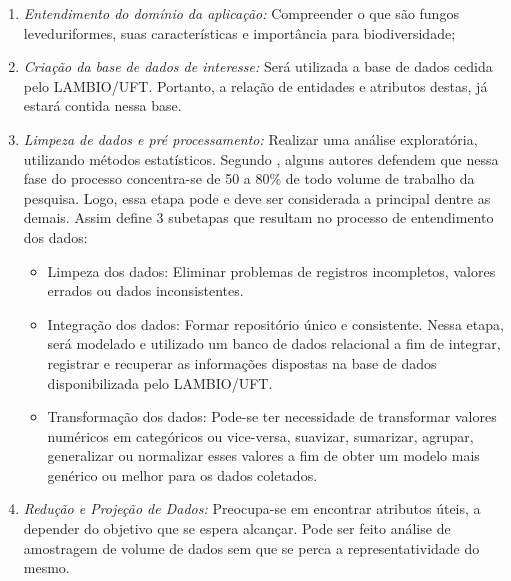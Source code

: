 \documentclass[tcc2]{classe_uftex/uftex}
\begin{document}
\begin{enumerate}
        \item \emph{Entendimento do domínio da aplicação:}
        Compreender o que são fungos leveduriformes, suas características e importância para biodiversidade;
        \item \emph{Criação da base de dados de interesse:}
        Será utilizada a base de dados cedida pelo LAMBIO/UFT. Portanto, a relação de entidades e atributos destas, já estará contida nessa base.
        \item \emph{Limpeza de dados e pré processamento:}
        Realizar uma análise exploratória, utilizando métodos estatísticos. Segundo , alguns autores defendem que nessa fase do processo concentra-se de 50 a 80\% de todo volume de trabalho da pesquisa. Logo, essa etapa pode e deve ser considerada a principal dentre as demais. Assim  define 3 subetapas que resultam no processo de entendimento dos dados:
         \begin{itemize}
             \item Limpeza dos dados:
             Eliminar problemas de registros incompletos, valores errados ou dados inconsistentes.
             \item Integração dos dados:
             Formar repositório único e consistente. Nessa etapa, será modelado e utilizado um banco de dados relacional a fim de integrar, registrar e recuperar as informações dispostas na base de dados disponibilizada pelo LAMBIO/UFT.
             \item Transformação dos dados:
             Pode-se ter necessidade de transformar valores numéricos em categóricos ou vice-versa, suavizar, sumarizar, agrupar, generalizar ou normalizar esses valores a fim de obter um modelo mais genérico ou melhor para os dados coletados.
         \end{itemize}
        \item \emph{Redução e Projeção de Dados:}
        Preocupa-se em encontrar atributos úteis, a depender do objetivo que se espera alcançar. Pode ser feito análise de amostragem de volume de dados sem que se perca a representatividade do mesmo.%

\end{enumerate}
\end{document}
